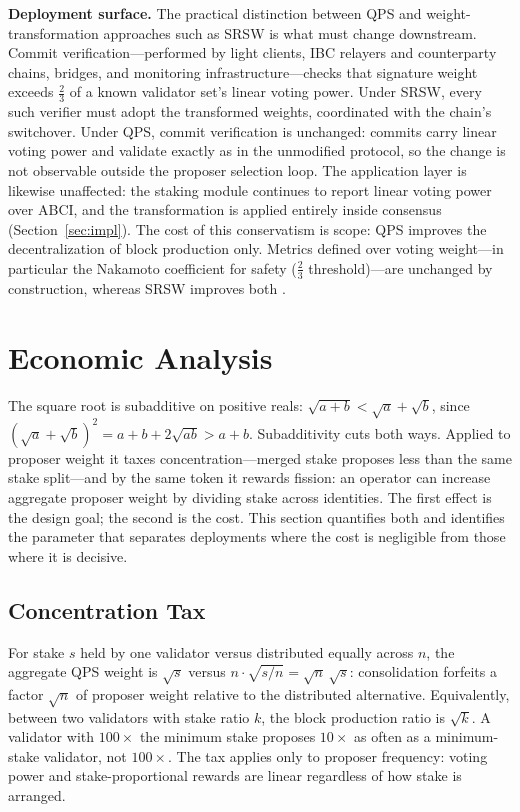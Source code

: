 \documentclass[11pt,a4paper]{article}
\begin{document}
\textbf{Deployment surface.} The practical distinction between QPS and weight-transformation approaches such as SRSW is what must change downstream. Commit verification---performed by light clients, IBC relayers and counterparty chains, bridges, and monitoring infrastructure---checks that signature weight exceeds $\frac{2}{3}$ of a known validator set's linear voting power. Under SRSW, every such verifier must adopt the transformed weights, coordinated with the chain's switchover. Under QPS, commit verification is unchanged: commits carry linear voting power and validate exactly as in the unmodified protocol, so the change is not observable outside the proposer selection loop. The application layer is likewise unaffected: the staking module continues to report linear voting power over ABCI, and the transformation is applied entirely inside consensus (Section~\ref{sec:impl}). The cost of this conservatism is scope: QPS improves the decentralization of block production only. Metrics defined over voting weight---in particular the Nakamoto coefficient for safety ($\frac{2}{3}$ threshold)---are unchanged by construction, whereas SRSW improves both \cite{srsw}.

\section{Economic Analysis}
\label{sec:econ}

The square root is subadditive on positive reals: $\sqrt{a+b} < \sqrt{a} + \sqrt{b}$, since $(\sqrt{a}+\sqrt{b})^2 = a + b + 2\sqrt{ab} > a+b$. Subadditivity cuts both ways. Applied to proposer weight it taxes concentration---merged stake proposes less than the same stake split---and by the same token it rewards fission: an operator can increase aggregate proposer weight by dividing stake across identities. The first effect is the design goal; the second is the cost. This section quantifies both and identifies the parameter that separates deployments where the cost is negligible from those where it is decisive.

\subsection{Concentration Tax}
\label{sec:tax}

For stake $s$ held by one validator versus distributed equally across $n$, the aggregate QPS weight is $\sqrt{s}$ versus $n \cdot \sqrt{s/n} = \sqrt{n}\,\sqrt{s}$: consolidation forfeits a factor $\sqrt{n}$ of proposer weight relative to the distributed alternative. Equivalently, between two validators with stake ratio $k$, the block production ratio is $\sqrt{k}$. A validator with $100\times$ the minimum stake proposes $10\times$ as often as a minimum-stake validator, not $100\times$. The tax applies only to proposer frequency: voting power and stake-proportional rewards are linear regardless of how stake is arranged.
\end{document}

